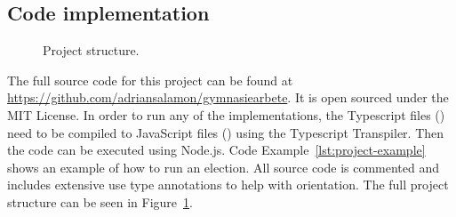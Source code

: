 \documentclass[12pt]{article}
\begin{document}
\printbibliography[
heading=bibintoc,
title={References}
]
\pagebreak
\begin{appendices}
\section{Code implementation}
\label{sec:conde implementation}
\begin{figure}[H]
\caption{Project structure.}
\label{fig:project-structure}
\end{figure}
The full source code for this project can be found at \url{https://github.com/adriansalamon/gymnasiearbete}. It is open sourced under the MIT License. In order to run any of the implementations, the Typescript files () need to be compiled to JavaScript files () using the Typescript Transpiler. Then the code can be executed using Node.js. Code Example~\ref{lst:project-example} shows an example of how to run an election.
All source code is commented and includes extensive use type annotations to help with orientation. The full project structure can be seen in Figure~\ref{fig:project-structure}.


\end{appendices}
\end{document}
